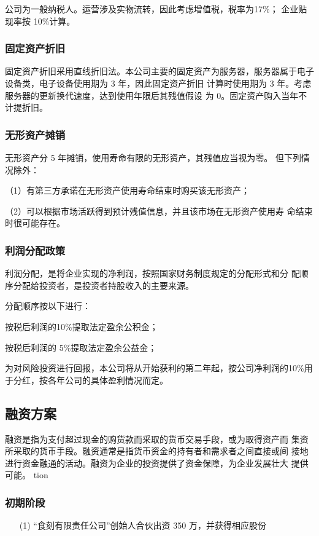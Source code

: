 \documentclass[UTF8,12pt]{ctexart}
\numberwithin{figure}{section}%
\begin{document}
\begin{spacing}{2}
公司为一般纳税人。运营涉及实物流转，因此考虑增值税，税率为17\%；
企业贴现率按 10\%计算。

\subsubsection{固定资产折旧 }
固定资产折旧采用直线折旧法。本公司主要的固定资产为服务器，服务器属于电子设备类，电子设备使用期为 3 年，因此固定资产折旧 计算时使用期为 3 年。考虑服务器的更新换代速度，达到使用年限后其残值假设 为 0。固定资产购入当年不计提折旧。
\subsubsection{无形资产摊销 }
无形资产分 5 年摊销，使用寿命有限的无形资产，其残值应当视为零。 但下列情况除外： 

（1）有第三方承诺在无形资产使用寿命结束时购买该无形资产； 

（2）可以根据市场活跃得到预计残值信息，并且该市场在无形资产使用寿 命结束时很可能存在。


\subsubsection{利润分配政策}

利润分配，是将企业实现的净利润，按照国家财务制度规定的分配形式和分 配顺序分配给投资者，是投资者持股收入的主要来源。

分配顺序按以下进行：  

按税后利润的10\%提取法定盈余公积金；  

按税后利润的 5\%提取法定盈余公益金； 

为对风险投资进行回报，本公司将从开始获利的第二年起，按公司净利润的10\%用于分红，按各年公司的具体盈利情况而定。

\subsection{融资方案} 
融资是指为支付超过现金的购货款而采取的货币交易手段，或为取得资产而 集资所采取的货币手段。融资通常是指货币资金的持有者和需求者之间直接或间 接地进行资金融通的活动。融资为企业的投资提供了资金保障，为企业发展壮大 提供可能。
tion{}

\subsubsection{初期阶段}

\begin{enumerate}
	\item [(1)]“食刻有限责任公司”创始人合伙出资 350 万，并获得相应股份 
	

\end{enumerate}
\end{spacing}
\end{document}
